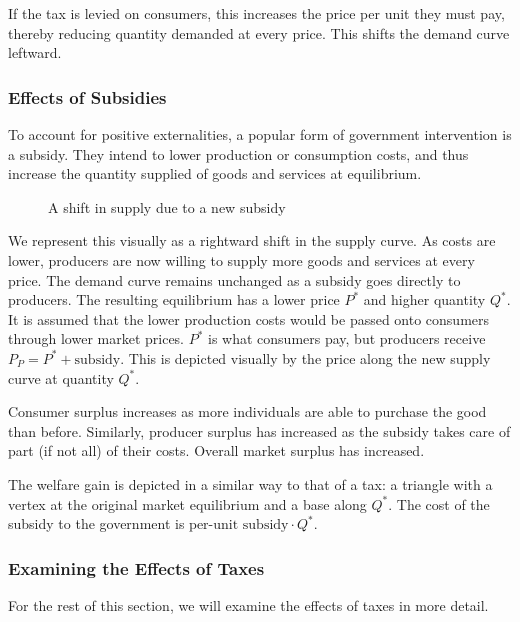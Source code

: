 \documentclass[letterpaper,10pt,english]{jupyterBook}
\let\sphinxpxdimen\pdfpxdimen\else\newdimen\sphinxpxdimen
\begin{document}
\sphinxAtStartPar
If the tax is levied on consumers, this increases the price per unit they must pay, thereby reducing quantity demanded at every price. This shifts the demand curve leftward.


\subsubsection{Effects of Subsidies}
\label{\detokenize{content/03-public/taxes-subsidies:effects-of-subsidies}}
\sphinxAtStartPar
To account for positive externalities, a popular form of government intervention is a subsidy. They intend to lower production or consumption costs, and thus increase the quantity supplied of goods and services at equilibrium.

\begin{figure}[htbp]
\centering
\capstart

\noindent\sphinxincludegraphics[width=500\sphinxpxdimen]{{fig5-subsidy}.png}
\caption{A shift in supply due to a new subsidy}\label{\detokenize{content/03-public/taxes-subsidies:subsidy}}\end{figure}

\sphinxAtStartPar
We represent this visually as a rightward shift in the supply curve. As costs are lower, producers are now willing to supply more goods and services at every price. The demand curve remains unchanged as a subsidy goes directly to producers. The resulting equilibrium has a lower price \(P^*\) and higher quantity \(Q^*\). It is assumed that the lower production costs would be passed onto consumers through lower market prices. \(P^*\) is what consumers pay, but producers receive \(P_P = P^* + \text{subsidy}\). This is depicted visually by the price along the new supply curve at quantity \(Q^*\).

\sphinxAtStartPar
Consumer surplus increases as more individuals are able to purchase the good than before. Similarly, producer surplus has increased as the subsidy takes care of part (if not all) of their costs. Overall market surplus has increased.

\sphinxAtStartPar
The welfare gain is depicted in a similar way to that of a tax: a triangle with a vertex at the original market equilibrium and a base along \(Q^*\). The cost of the subsidy to the government is \(\text{per-unit subsidy} \cdot Q^*\).


\subsubsection{Examining the Effects of Taxes}
\label{\detokenize{content/03-public/taxes-subsidies:examining-the-effects-of-taxes}}
\sphinxAtStartPar
For the rest of this section, we will examine the effects of taxes in more detail.
\end{document}
